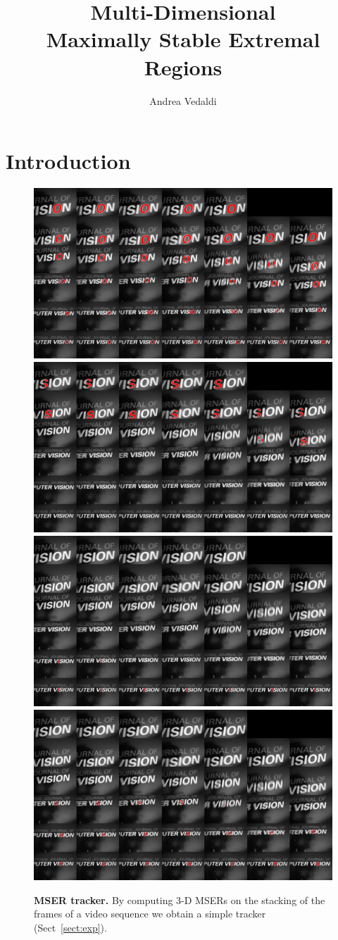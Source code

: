 \documentclass{article}
\title{Multi-Dimensional \\ Maximally Stable Extremal Regions}
\author{Andrea Vedaldi}
\begin{document}
\maketitle{}

\tableofcontents{}

\section{Introduction}\label{sect:intro}

\begin{figure}
\begin{center}
\includegraphics[width=.498\textwidth]{figures/region-148.png}\hfill %
\includegraphics[width=.498\textwidth]{figures/region-211.png}\\
\includegraphics[width=.498\textwidth]{figures/region-121.png}\hfill %
\includegraphics[width=.498\textwidth]{figures/region-111.png}\\
\end{center}
\caption{{\bf MSER tracker.} By computing 3-D MSERs on the stacking of the frames of a video sequence we obtain a simple tracker (Sect~\ref{sect:exp}).}
\label{fig:exp.ok}
\end{figure}
\end{document}
